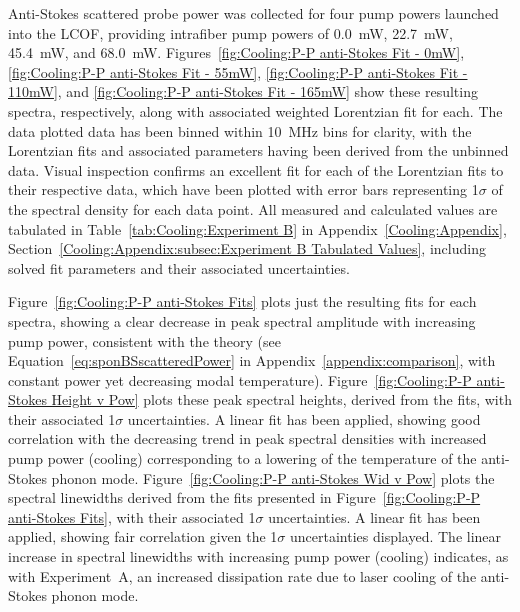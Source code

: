 Anti-Stokes scattered probe power was collected for four pump powers launched into the \ac{LCOF}, providing intrafiber pump powers of \SI{0.0}{\milli\watt}, \SI{22.7}{\milli\watt}, \SI{45.4}{\milli\watt}, and \SI{68.0}{\milli\watt}. Figures~\ref{fig:Cooling:P-P anti-Stokes Fit - 0mW}, \ref{fig:Cooling:P-P anti-Stokes Fit - 55mW}, \ref{fig:Cooling:P-P anti-Stokes Fit - 110mW}, and \ref{fig:Cooling:P-P anti-Stokes Fit - 165mW} show these resulting spectra, respectively, along with associated weighted Lorentzian fit for each. The data plotted data has been binned within \SI{10}{\mega\hertz} bins for clarity, with the Lorentzian fits and associated parameters having been derived from the unbinned data. Visual inspection confirms an excellent fit for each of the Lorentzian fits to their respective data, which have been plotted with error bars representing 1\(\sigma\) of the spectral density for each data point. All measured and calculated values are tabulated in Table~\ref{tab:Cooling:Experiment B} in Appendix~\ref{Cooling:Appendix}, Section~\ref{Cooling:Appendix:subsec:Experiment B Tabulated Values}, including solved fit parameters and their associated uncertainties.

Figure~\ref{fig:Cooling:P-P anti-Stokes Fits} plots just the resulting fits for each spectra, showing a clear decrease in peak spectral amplitude with increasing pump power, consistent with the theory (see Equation~\ref{eq:sponBSscatteredPower} in Appendix~\ref{appendix:comparison}, with constant power yet decreasing modal temperature). Figure~\ref{fig:Cooling:P-P anti-Stokes Height v Pow} plots these peak spectral heights, derived from the fits, with their associated 1\(\sigma\) uncertainties. A linear fit has been applied, showing good correlation with the decreasing trend in peak spectral densities with increased pump power (cooling) corresponding to a lowering of the temperature of the anti-Stokes phonon mode. Figure~\ref{fig:Cooling:P-P anti-Stokes Wid v Pow} plots the spectral linewidths derived from the fits presented in Figure~\ref{fig:Cooling:P-P anti-Stokes Fits}, with their associated 1\(\sigma\) uncertainties. A linear fit has been applied, showing fair correlation given the 1\(\sigma\) uncertainties displayed. The linear increase in spectral linewidths with increasing pump power (cooling) indicates, as with Experiment~A, an increased dissipation rate due to laser cooling of the anti-Stokes phonon mode.

